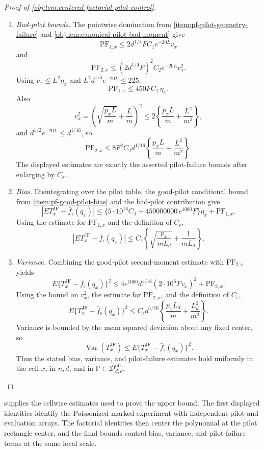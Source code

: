 \documentclass[11pt]{article}
\begin{document}
\begin{proof}[Proof of \cref{obj:lem:centered-factorial-pilot-control}]
\begin{enumerate}
\item \emph{Bad-pilot bounds.}
The pointwise domination from \cref{item:pf-pilot-geometry-failure} and \cref{obj:lem:canonical-pilot-bad-moment} give
\[
\mathrm{PF}_{1,x}
\le
2d^{1/4}FC_1e^{-20L}v_x
\]
and
\[
\mathrm{PF}_{2,x}
\le
(2d^{1/4}F)^2C_2e^{-20L}v_x^2 .
\]
Using \(v_x\le L^2\eta_x\) and \(L^2d^{1/4}e^{-20L}\le225\),
\[
\mathrm{PF}_{1,x}\le450FC_1\,\eta_x .
\]
Also
\[
v_x^2
=
\left(\sqrt{\frac{p_xL}{m}}+\frac Lm\right)^2
\le
2\left\{\frac{p_xL}{m}+\frac{L^2}{m^2}\right\},
\]
and \(d^{1/2}e^{-20L}\le d^{1/16}\), so
\[
\mathrm{PF}_{2,x}
\le
8F^2C_2d^{1/16}
\left\{\frac{p_xL}{m}+\frac{L^2}{m^2}\right\}.
\]
The displayed estimates are exactly the asserted pilot-failure bounds after enlarging by
\(C_\epsilon\).

\item \emph{Bias.}
Disintegrating over the pilot table, the good-pilot conditional bound from \cref{item:pf-good-pilot-bias} and the bad-pilot contribution give
\[
\left|
E T_x^{\mathrm{JF}}-\bar f_\epsilon(q_x)
\right|
\le
\{5\cdot10^{16}C_J+450000000\,e^{1000}F\}\eta_x+\mathrm{PF}_{1,x}.
\]
Using the estimate for \(\mathrm{PF}_{1,x}\) and the definition of \(C_\epsilon\),
\[
\left|
E T_x^{\mathrm{JF}}-\bar f_\epsilon(q_x)
\right|
\le
C_\epsilon
\left\{
\sqrt{\frac{p_x}{mL_d}}+\frac1{mL_d}
\right\}.
\]

\item \emph{Variance.}
Combining the good-pilot second-moment estimate with \(\mathrm{PF}_{2,x}\) yields
\[
E\{T_x^{\mathrm{JF}}-\bar f_\epsilon(q_x)\}^2
\le
4e^{1000}d^{1/16}(2\cdot10^6Fv_x)^2+\mathrm{PF}_{2,x}.
\]
Using the bound on \(v_x^2\), the estimate for \(\mathrm{PF}_{2,x}\), and the definition of
\(C_\epsilon\),
\[
E\{T_x^{\mathrm{JF}}-\bar f_\epsilon(q_x)\}^2
\le
C_\epsilon d^{1/16}
\left\{
\frac{p_xL_d}{m}+\frac{L_d^2}{m^2}
\right\}.
\]
Variance is bounded by the mean squared deviation about any fixed center, so
\[
\operatorname{Var}(T_x^{\mathrm{JF}})
\le
E\{T_x^{\mathrm{JF}}-\bar f_\epsilon(q_x)\}^2.
\]
Thus the stated bias, variance, and pilot-failure estimates hold uniformly in the cell \(x\), in
\(n,d\), and in \(\mathbb P\in\mathcal D_{d,\epsilon}^{\mathrm{obs}}\).
\end{enumerate}
\end{proof}

 supplies the cellwise estimates used to prove the upper bound. The first displayed identities identify the Poissonized marked experiment with independent pilot and evaluation arrays. The factorial identities then center the polynomial at the pilot rectangle center, and the final bounds control bias, variance, and pilot-failure terms at the same local scale.
\end{document}
